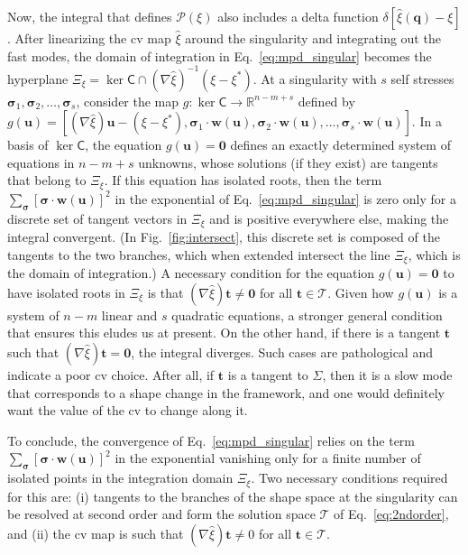 Now, the integral that defines $\mathscr{P}(\xi)$ also includes a delta function $\delta[\hat{\xi}(\bm{q}) - \xi]$.
After linearizing the \ac{cv} map $\hat{\xi}$ around the singularity and integrating out the fast modes, the domain of integration in Eq.~\eqref{eq:mpd_singular} becomes the hyperplane $\Xi_{\xi} = \ker\mathsf{C} \cap (\nabla\hat{\xi})^{-1}(\xi - \xi^{*})$.
At a singularity with $s$ self stresses $\bm{\sigma}_{1}, \bm{\sigma}_{2}, \ldots, \bm{\sigma}_{s}$, consider the map $g: \ker\mathsf{C} \to \mathbb{R}^{n - m + s}$ defined by $g(\bm{u}) = [(\nabla\hat{\xi})\bm{u} - (\xi - \xi^{*}), \bm{\sigma}_{1}\cdot \bm{w}(\bm{u}), \bm{\sigma}_{2}\cdot \bm{w}(\bm{u}), \ldots, \bm{\sigma}_{s}\cdot \bm{w}(\bm{u})]$.
In a basis of $\ker\mathsf{C}$, the equation $g(\bm{u}) = \bm{0}$ defines an exactly determined system of equations in $n-m+s$ unknowns, whose solutions (if they exist) are tangents that belong to $\Xi_{\xi}$.
If this equation has isolated roots, then the term $\sum_{\bm{\sigma}} [\bm{\sigma}\cdot\bm{w}(\bm{u})]^{2}$ in the exponential of Eq.~\eqref{eq:mpd_singular} is zero only for a discrete set of tangent vectors in $\Xi_{\xi}$ and is positive everywhere else, making the integral convergent.
(In Fig.~\ref{fig:intersect}, this discrete set is composed of the tangents to the two branches, which when extended intersect the line $\Xi_{\xi}$, which is the domain of integration.)
A necessary condition for the equation $g(\bm{u}) = \bm{0}$ to have isolated roots in $\Xi_{\xi}$ is that $(\nabla\hat{\xi})\bm{t} \neq \bm{0}$ for all $\bm{t} \in \mathscr{T}$.
Given how $g(\bm{u})$ is a system of $n - m$ linear and $s$ quadratic equations, a stronger general condition that ensures this eludes us at present.
On the other hand, if there is a tangent $\bm{t}$ such that $(\nabla\hat{\xi})\bm{t} = \bm{0}$, the integral diverges.
Such cases are pathological and indicate a poor \ac{cv} choice.
After all, if $\bm{t}$ is a tangent to $\Sigma$, then it is a slow mode that corresponds to a shape change in the framework, and one would definitely want the value of the \ac{cv} to change along it.

To conclude, the convergence of Eq.~\eqref{eq:mpd_singular} relies on the term $\sum_{\bm{\sigma}}[\bm{\sigma}\cdot\bm{w}(\bm{u})]^{2}$ in the exponential vanishing only for a finite number of isolated points in the integration domain $\Xi_{\xi}$.
Two necessary conditions required for this are: (i) tangents to the branches of the shape space at the singularity can be resolved at second order and form the solution space $\mathscr{T}$ of Eq.~\eqref{eq:2ndorder}, and (ii) the \ac{cv} map is such that $(\nabla\hat{\xi})\bm{t} \neq 0$ for all $\bm{t} \in \mathscr{T}$.

